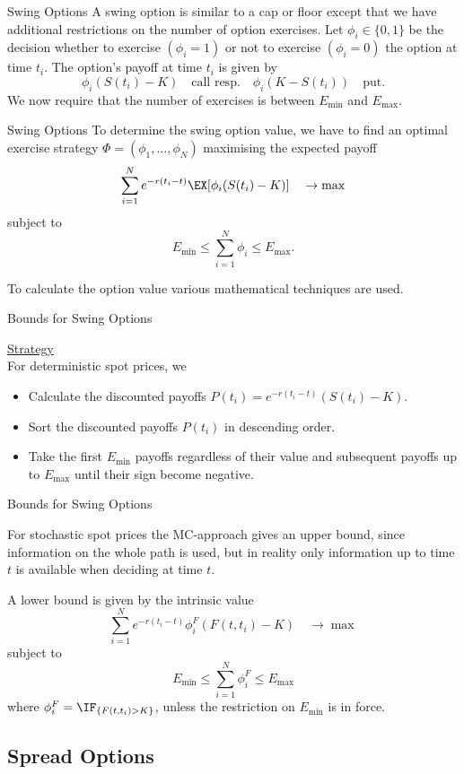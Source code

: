 {Swing Options}
A swing option is similar to a cap or floor except that we have
additional restrictions on the number of option exercises. Let
$\phi_i\in\{0,1\}$ be the decision whether to exercise
$(\phi_i=1)$ or not to exercise $(\phi_i=0)$ the option at time
$t_i$. The option's payoff at time $t_i$ is given by
$$\phi_i(S(t_i)-K)\quad\mbox{call resp.}\quad\phi_i(K-S(t_i))\quad\mbox{put}.$$
We now require that the number of exercises is between $E_{\min}$
and $E_{\max}$.


{Swing Options}
To determine the swing option value, we have to find an optimal exercise
strategy $\Phi=(\phi_1,\ldots,\phi_N)$ maximising the expected
payoff
$$\sum_{i=1}^Ne^{-r(t_i-t)}\EX[{\phi_i(S(t_i)-K)}]\quad\rightarrow\max$$
subject to $$E_{\min}\leq\sum_{i=1}^N\phi_i\leq E_{\max}.$$

To calculate the option value various mathematical techniques are used.


{Bounds for Swing Options}

\underline{Strategy}\\
For deterministic spot prices, we
\begin{itemize}
  \item  Calculate the discounted payoffs
  $P(t_i)=e^{-r(t_i-t)}(S(t_i)-K)$.
  \item  Sort the discounted payoffs $P(t_i)$ in descending order.
  \item Take the first $E_{\min}$ payoffs regardless of their
  value and subsequent payoffs up to $E_{\max}$ until their sign
  become negative.
\end{itemize}


{Bounds for Swing Options}

For stochastic spot prices the MC-approach gives an upper bound,
since information on the whole path is used, but in reality only
information up to time $t$ is available when deciding at time $t$.

A lower bound is given by the intrinsic value
$$\sum_{i=1}^Ne^{-r(t_i-t)} \phi_i^F (F(t,t_i)-K) \quad\rightarrow\max$$
subject to $$E_{\min}\leq\sum_{i=1}^N\phi^F_i\leq E_{\max}$$
where $\phi_i^F=\IF_{\{F(t,t_i)>K\}}$, unless the restriction on $E_{\min}$ is in force.




\subsection{Spread Options}

